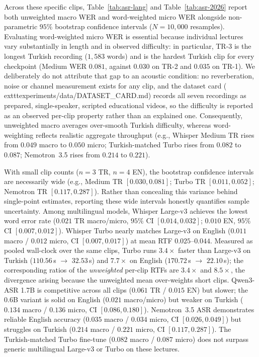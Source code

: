 \documentclass[conference]{IEEEtran}
\begin{document}
Across these specific clips, Table~\ref{tab:asr-lang} and Table~\ref{tab:asr-2026} report both unweighted macro WER and word-weighted micro WER alongside non-parametric $95\%$ bootstrap confidence intervals ($N=10{,}000$ resamples). Evaluating word-weighted micro WER is essential because individual lectures vary substantially in length and in observed difficulty: in particular, TR-3 is the longest Turkish recording ($1{,}583$ words) and is the hardest Turkish clip for every checkpoint (Medium WER $0.081$, against $0.030$ on TR-2 and $0.035$ on TR-1). We deliberately do not attribute that gap to an acoustic condition: no reverberation, noise or channel measurement exists for any clip, and the dataset card (	exttt{experiments/data/DATASET\_CARD.md}) records all seven recordings as prepared, single-speaker, scripted educational videos, so the difficulty is reported as an observed per-clip property rather than an explained one. Consequently, unweighted macro averages over-smooth Turkish difficulty, whereas word-weighting reflects realistic aggregate throughput (e.g., Whisper Medium TR rises from $0.049$ macro to $0.050$ micro; Turkish-matched Turbo rises from $0.082$ to $0.087$; Nemotron~3.5 rises from $0.214$ to $0.221$). 

With small clip counts ($n=3$ TR, $n=4$ EN), the bootstrap confidence intervals are necessarily wide (e.g., Medium TR $[0.030, 0.081]$; Turbo TR $[0.011, 0.052]$; Nemotron TR $[0.117, 0.287]$). Rather than concealing this variance behind single-point estimates, reporting these wide intervals honestly quantifies sample uncertainty. Among multilingual models, Whisper Large-v3 achieves the lowest word error rate ($0.021$ TR macro/micro, $95\%$ CI $[0.014, 0.032]$; $0.010$ EN, $95\%$ CI $[0.007, 0.012]$). Whisper Turbo nearly matches Large-v3 on English ($0.011$ macro / $0.012$ micro, CI $[0.007, 0.017]$) at mean RTF $0.025$--$0.044$. Measured as pooled wall-clock over the same clips, Turbo runs $3.4\times$ faster than Large-v3 on Turkish ($110.56$\,s $\rightarrow$ $32.53$\,s) and $7.7\times$ on English ($170.72$\,s $\rightarrow$ $22.10$\,s); the corresponding ratios of the \emph{unweighted} per-clip RTFs are $3.4\times$ and $8.5\times$, the divergence arising because the unweighted mean over-weights short clips. Qwen3-ASR 1.7B is competitive across all clips ($0.061$ TR / $0.015$ EN) but slower; the 0.6B variant is solid on English ($0.021$ macro/micro) but weaker on Turkish ($0.134$ macro / $0.136$ micro, CI $[0.086, 0.180]$). Nemotron~3.5 ASR demonstrates reliable English accuracy ($0.035$ macro / $0.034$ micro, CI $[0.026, 0.049]$) but struggles on Turkish ($0.214$ macro / $0.221$ micro, CI $[0.117, 0.287]$). The Turkish-matched Turbo fine-tune ($0.082$ macro / $0.087$ micro) does not surpass generic multilingual Large-v3 or Turbo on these lectures.
\end{document}
